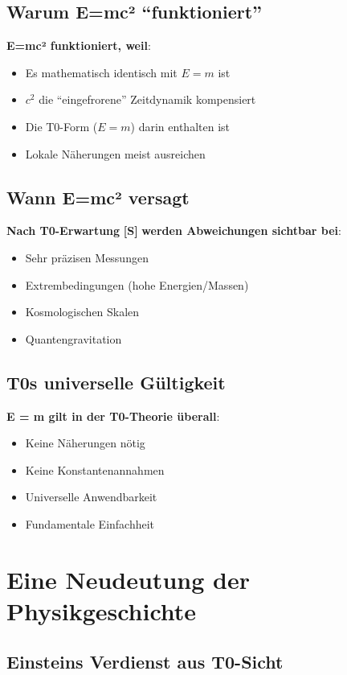 	\subsection{Warum E=mc² ``funktioniert''}
	
	\textbf{E=mc² funktioniert, weil}:
	\begin{itemize}
		\item Es mathematisch identisch mit $E = m$ ist
		\item $c^2$ die ``eingefrorene'' Zeitdynamik kompensiert
		\item Die T0-Form ($E = m$) darin enthalten ist
		\item Lokale Näherungen meist ausreichen
	\end{itemize}
	
	\subsection{Wann E=mc² versagt}
	
	\textbf{Nach T0-Erwartung} \textbf{[S]} \textbf{werden Abweichungen sichtbar bei}:
	\begin{itemize}
		\item Sehr präzisen Messungen
		\item Extrembedingungen (hohe Energien/Massen)
		\item Kosmologischen Skalen
		\item Quantengravitation
	\end{itemize}
	
	\subsection{T0s universelle Gültigkeit}
	
	\textbf{E = m gilt in der T0-Theorie überall}:
	\begin{itemize}
		\item Keine Näherungen nötig
		\item Keine Konstantenannahmen
		\item Universelle Anwendbarkeit
		\item Fundamentale Einfachheit
	\end{itemize}
	
	\section{Eine Neudeutung der Physikgeschichte}
	
	\subsection{Einsteins Verdienst aus T0-Sicht}
	
